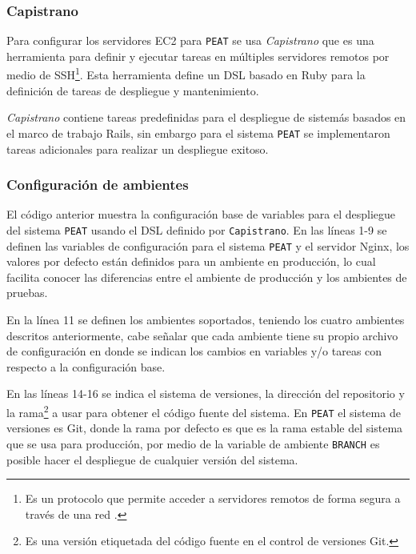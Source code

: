 \subsubsection{Capistrano}

Para configurar los servidores EC2 para \texttt{PEAT} se usa \textit{Capistrano}
que es una herramienta para definir y ejecutar tareas en
múltiples servidores remotos por medio de SSH\footnote{Es un protocolo que permite
  acceder a servidores remotos de forma segura a través de una red
  \cite{29_ssh_protocol}.}. Esta herramienta define un DSL basado en Ruby para la
definición de tareas de despliegue y mantenimiento.

\textit{Capistrano} contiene tareas predefinidas para el despliegue de sistemás
basados en el marco de trabajo Rails, sin embargo para el sistema \texttt{PEAT} se
implementaron tareas adicionales para realizar un despliegue exitoso.

\subsubsection{Configuración de ambientes}



El código anterior muestra la configuración base de variables para el
despliegue del sistema \texttt{PEAT} usando el DSL definido por \texttt{Capistrano}.
En las líneas 1-9 se definen las variables de configuración para el sistema
\texttt{PEAT} y el servidor Nginx, los valores por defecto están definidos
para un ambiente en producción, lo cual facilita conocer las diferencias
entre el ambiente de producción y los ambientes de pruebas.

En la línea 11 se definen los ambientes soportados, teniendo los cuatro
ambientes descritos anteriormente, cabe señalar que cada ambiente tiene
su propio archivo de configuración en donde se indican los cambios en variables
y/o tareas con respecto a la configuración base.

En las líneas 14-16 se indica el sistema de versiones, la dirección del repositorio
y la rama\footnote{Es una versión etiquetada del código fuente en el control de
  versiones Git.} a usar para obtener el código fuente del sistema.
En \texttt{PEAT} el sistema de versiones es Git, donde la rama por defecto
es  que es la rama estable del sistema que
se usa para producción, por medio de la variable de ambiente \texttt{BRANCH} es
posible hacer el despliegue de cualquier versión del sistema.

